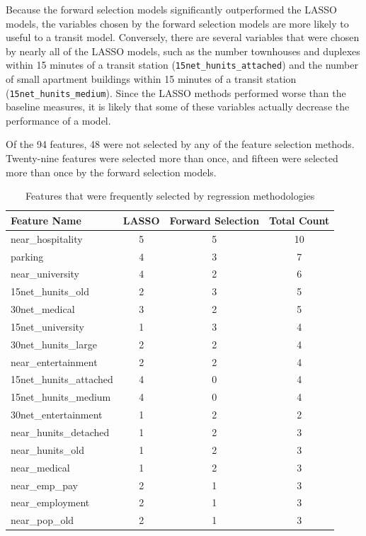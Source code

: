 \documentclass[11pt]{article}
\begin{document}
Because the forward selection models significantly outperformed the LASSO models, the variables chosen by the forward selection models are more likely to useful to a transit model. Conversely, there are several variables that were chosen by nearly all of the LASSO models, such as the number townhouses and duplexes within 15 minutes of a transit station (\texttt{15net\_hunits\_attached}) and the number of small apartment buildings within 15 minutes of a transit station (\texttt{15net\_hunits\_medium}). Since the LASSO methods performed worse than the baseline measures, it is likely that some of these variables actually decrease the performance of a model. 

Of the 94 features, 48 were not selected by any of the feature selection methods. Twenty-nine features were selected more than once, and fifteen were selected more than once by the forward selection models. 

\begin{table}[H]
\begingroup\fontsize{10}{15}\selectfont
\centering
\begin{tabular}{lccc}
\toprule
Feature Name&LASSO&Forward Selection&Total Count\\
\midrule
near\_hospitality&5&5&10\\
parking&4&3&7\\
near\_university&4&2&6\\
15net\_hunits\_old&2&3&5\\
30net\_medical&3&2&5\\
15net\_university&1&3&4\\
30net\_hunits\_large&2&2&4\\
near\_entertainment&2&2&4\\
15net\_hunits\_attached&4&0&4\\
15net\_hunits\_medium&4&0&4\\
30net\_entertainment&1&2&2\\
near\_hunits\_detached&1&2&3\\
near\_hunits\_old&1&2&3\\
near\_medical&1&2&3\\
near\_emp\_pay&2&1&3\\
near\_employment&2&1&3\\
near\_pop\_old&2&1&3\\
\end{tabular}
\caption{Features that were frequently selected by regression methodologies}\label{tab:featuresum}
\endgroup
\end{table}
\end{document}
